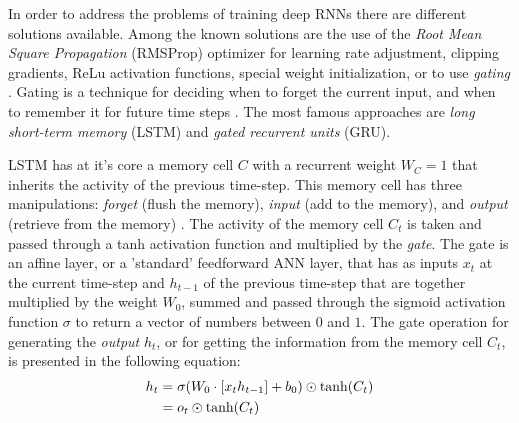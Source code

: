 In order to address the problems of training deep RNNs there are different solutions available. Among the known solutions are the use of the \textit{Root Mean Square Propagation} (RMSProp) optimizer for learning rate adjustment, clipping gradients, ReLu activation functions, special weight initialization, or to use \textit{gating} \cite{NeonRNN}. Gating is a technique for deciding when to forget the current input, and when to remember it for future time steps \cite{RNNvideo}. The most famous approaches are \textit{long short-term memory} (LSTM) and \textit{gated recurrent units} (GRU).

LSTM has at it's core a memory cell $C$ with a recurrent weight $W_{C}=1$ that inherits the activity of the previous time-step. This memory cell has three manipulations: \textit{forget} (flush the memory), \textit{input} (add to the memory), and \textit{output} (retrieve from the memory) \cite{NeonRNN}. The activity of the memory cell $C_{t}$ is taken and passed through a tanh activation function and multiplied by the \textit{gate}. The gate is an affine layer, or a 'standard' feedforward ANN layer, that has as inputs $x_{t}$ at the current time-step and $h_{t-1}$ of the previous time-step that are together multiplied by the weight $W_{0}$, summed and passed through the sigmoid activation function $\sigma$ to return a vector of numbers between $0$ and $1$. The gate operation for generating the \textit{output} $h_{t}$, or for getting the information from the memory cell $C_{t}$, is presented in the following equation:
\begin{equation}\label{gate}
\begin{split}
h_{t}&=\sigma(W_{0}\cdot \left [ x_{t} h_{t-1} \right ]+b_{0})\odot \textup{tanh}(C_{t})\\
&=o_{t}\odot \textup{tanh}(C_{t})
\end{split}
\end{equation}

